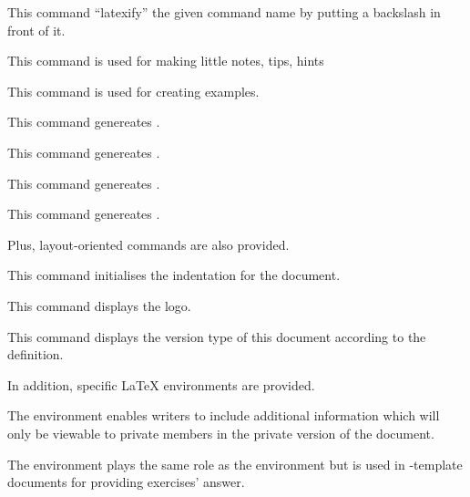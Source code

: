          {
           This command ``latexify'' the given command name by putting
           a backslash in front of it.
         }

         {
           This command is used for making little notes, tips, hints \etc{}
         }

         {
           This command is used for creating examples.
         }

         {
           This command genereates \ie{}.
         }

         {
           This command genereates \eg{}.
         }

         {
           This command genereates \etc{}.
         }

         {
           This command genereates \aka{}.
         }

Plus, layout-oriented commands are also provided.

         {
           This command initialises the indentation for the document.
         }

         {
           This command displays the  logo.
         }

         {
           This command displays the version type of this document according
           to the  definition.
         }

In addition, specific {\LaTeX} environments are provided.

         {
           The  environment enables writers to include additional
           information which will only be viewable to private members \ie{}
           in the private version of the document.
         }

         {
           The  environment plays the same role as the
            environment but is used in -template
           documents for providing exercises' answer.
         }
